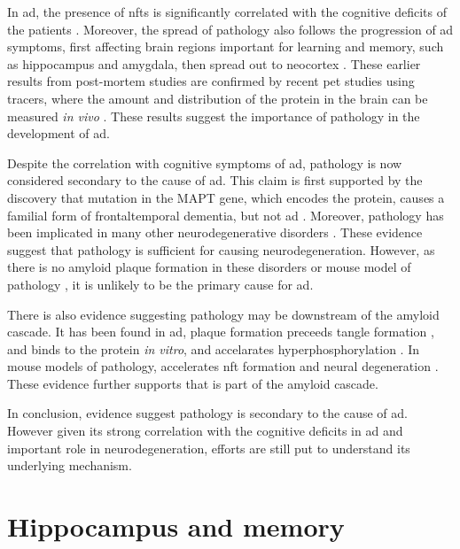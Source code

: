 In \gls{ad}, the presence of \glspl{nft} is significantly correlated with the cognitive deficits of the patients \citep{hyman12}. Moreover, the spread of \atau{} pathology also follows the progression of \gls{ad} symptoms, first affecting brain regions important for learning and memory, such as hippocampus and amygdala, then spread out to neocortex \citep{braak91}. These earlier results from post-mortem studies are confirmed by recent \gls{pet} studies using \atau{} tracers, where the amount and distribution of the \atau{} protein in the brain can be measured \textit{in vivo} \citep{ossenkoppele16, scholl16}. These results suggest the importance of \atau{} pathology in the development of \gls{ad}.

Despite the correlation with cognitive symptoms of \gls{ad}, \atau{} pathology is now considered secondary to the cause of \gls{ad}. This claim is first supported by the discovery that mutation in the MAPT gene, which encodes the \atau{} protein, causes a familial form of frontaltemporal dementia, but not \gls{ad} \citep{hutton98, poorkaj98}. Moreover, \atau{} pathology has been implicated in many other neurodegenerative disorders \citep[e.g.][]{williams09, mckee16}. These evidence suggest that \atau{} pathology is sufficient for causing neurodegeneration. However, as there is no amyloid plaque formation in these disorders or mouse model of \atau{} pathology \citep{gotz04}, it is unlikely to be the primary cause for \gls{ad}.

There is also evidence suggesting \atau{} pathology may be downstream of the amyloid cascade. It has been found in \gls{ad}, plaque formation preceeds tangle formation \citep{price99}, and \abeta{} binds to the \atau{} protein \textit{in vitro}, and accelarates \atau{} hyperphosphorylation \citep{guo06, zempel10}. In mouse models of \atau{} pathology, \abeta{} accelerates \gls{nft} formation and neural degeneration \citep{lewis01, terwel08}. These evidence further supports that \atau{} is part of the amyloid cascade. 

In conclusion, evidence suggest \atau{} pathology is secondary to the cause of \gls{ad}. However given its strong correlation with the cognitive deficits in \gls{ad} and important role in neurodegeneration, efforts are still put to understand its underlying mechanism. 

\section{Hippocampus and memory}

